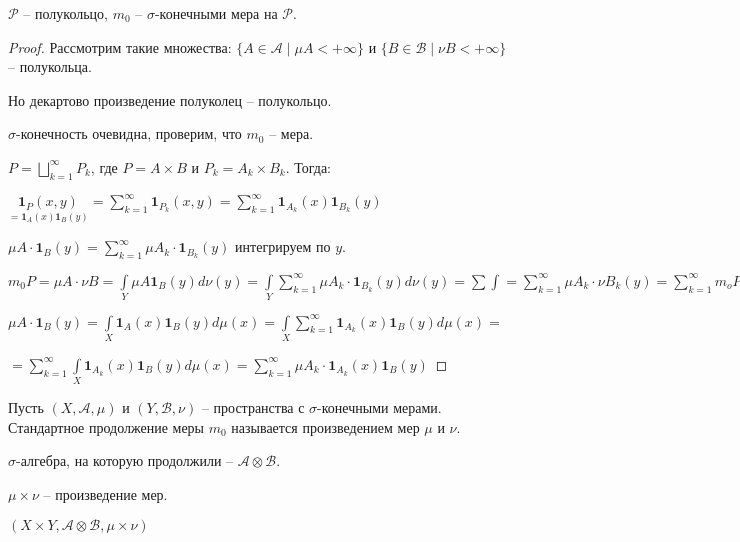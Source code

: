 \begin{theorem}
    $\mathcal{P}$ – полукольцо, $m_0$ – $\sigma$-конечными мера на $\mathcal{P}$.
\end{theorem}

\begin{proof}
    Рассмотрим такие множества: $\{A\in \mathcal{A}\mid \mu A <+\infty\}$ и $\{B\in \mathcal{B}\mid \nu B <+\infty\}$ –
    полукольца.

    Но декартово произведение полуколец – полукольцо.

    $\sigma$-конечность очевидна, проверим, что $m_0$ – мера.

    $P=\bigsqcup\limits_{k=1}^\infty P_k$, где $P=A\times B$ и $P_k=A_k\times B_k$. Тогда:

    $\underset{=\mathbf{1}_A(x)\mathbf{1}_B(y)}{\mathbf{1}_P(x, y)}=\sum\limits_{k=1}^\infty \mathbf{1}_{P_k}(x, y)=
    \sum\limits_{k=1}^\infty \mathbf{1}_{A_k}(x)\mathbf{1}_{B_k}(y)$

    $\mu A \cdot \mathbf{1}_B (y) = \sum\limits_{k=1}^\infty \mu A_k \cdot \mathbf{1}_{B_k}(y)$ интегрируем по $y$.

    $m_0 P = \mu A \cdot \nu B = \int \limits_Y \mu A \mathbf{1}_B(y) d\nu (y)=\int \limits_Y 
    \sum\limits_{k=1}^\infty \mu A_k \cdot \mathbf{1}_{B_k}(y) d\nu (y)=\sum \int
    = \sum\limits_{k=1}^\infty \mu A_k \cdot \nu B_k(y)=\sum\limits_{k=1}^\infty m_o P_k$

    $\mu A \cdot \mathbf{1}_{B}(y)=\int \limits_X \mathbf{1}_{A}(x)\mathbf{1}_{B}(y) d\mu (x)=
    \int \limits_X \sum\limits_{k=1}^\infty \mathbf{1}_{A_k}(x)\mathbf{1}_{B}(y) d\mu (x)=$
    
    $=\sum\limits_{k=1}^\infty \int \limits_X  \mathbf{1}_{A_k}(x)\mathbf{1}_{B}(y) d\mu (x)=
    \sum\limits_{k=1}^\infty \mu A_k \cdot \mathbf{1}_{A_k}(x)\mathbf{1}_{B}(y)$
\end{proof}

\begin{definition}
    Пусть $(X, \mathcal{A}, \mu)$ и $(Y, \mathcal{B}, \nu)$ – пространства с $\sigma$-конечными мерами.
    Стандартное продолжение меры $m_0$ называется произведением мер $\mu$ и $\nu$.

    $\sigma$-алгебра, на которую продолжили – $\mathcal{A}\otimes \mathcal{B}$.

    $\mu\times\nu$ – произведение мер.

    $(X\times Y, \mathcal{A}\otimes \mathcal{B}, \mu\times\nu)$
\end{definition}

